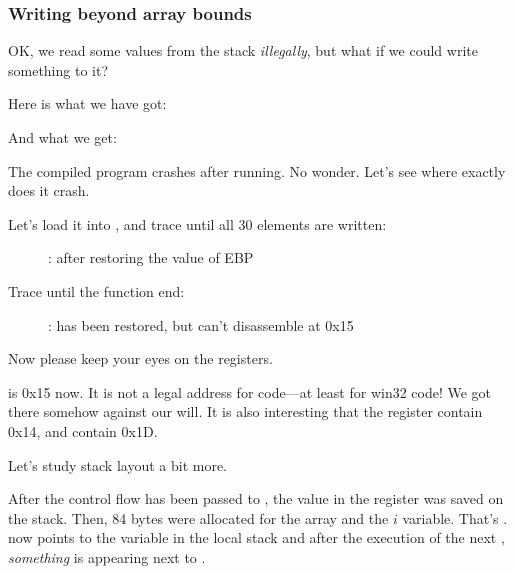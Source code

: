 \subsubsection{Writing beyond array bounds}

OK, we read some values from the stack \emph{illegally}, but what if we could write something to it?

Here is what we have got:




And what we get:



The compiled program crashes after running. No wonder. Let's see where exactly does it crash.

\clearpage
\myindex{\olly}

Let's load it into \olly, and trace until all 30 elements are written:

\begin{figure}[H]
\centering
{}
\caption{\olly: after restoring the value of EBP}
\label{fig:array_BO_olly_w1}
\end{figure}

\clearpage
Trace until the function end:

\begin{figure}[H]
\centering
{}
\caption{\olly: 
 has been restored, but \olly can't disassemble at 0x15}
\label{fig:array_BO_olly_w2}
\end{figure}

Now please keep your eyes on the registers.

\EIP is 0x15 now. It is not a legal address for code---at least for win32 code!
We got there somehow against our will.
It is also interesting that the \EBP register contain 0x14,
\ECX and \EDX contain 0x1D.

Let's study stack layout a bit more.

After the control flow has been passed to \TT{\main}, the value in the \EBP register was saved on the stack.
Then, 84 bytes were allocated for the array and the $i$ variable.
That's .
\ESP now points to the  variable in the local stack and after the execution of 
the next , \emph{something} is appearing next to .

